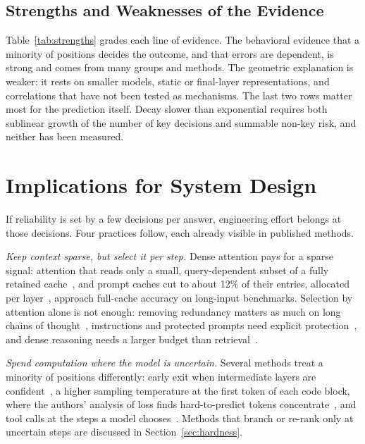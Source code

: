 \documentclass{ieeeaccess}
\begin{document}
\subsection{Strengths and Weaknesses of the Evidence}
Table~\ref{tab:strengths} grades each line of evidence. The behavioral evidence that a minority of positions decides the outcome, and that errors are dependent, is strong and comes from many groups and methods. The geometric explanation is weaker: it rests on smaller models, static or final-layer representations, and correlations that have not been tested as mechanisms. The last two rows matter most for the prediction itself. Decay slower than exponential requires both sublinear growth of the number of key decisions and summable non-key risk, and neither has been measured.

\section{Implications for System Design}
\label{sec:implications}
If reliability is set by a few decisions per answer, engineering effort belongs at those decisions. Four practices follow, each already visible in published methods.

\emph{Keep context sparse, but select it per step.} Dense attention pays for a sparse signal: attention that reads only a small, query-dependent subset of a fully retained cache~\cite{tang2024quest}, and prompt caches cut to about 12\% of their entries, allocated per layer~\cite{cai2024pyramidkv}, approach full-cache accuracy on long-input benchmarks. Selection by attention alone is not enough: removing redundancy matters as much on long chains of thought~\cite{cai2025rkv}, instructions and protected prompts need explicit protection~\cite{chen2026pitfalls}, and dense reasoning needs a larger budget than retrieval~\cite{liu2026semantic}.

\emph{Spend computation where the model is uncertain.} Several methods treat a minority of positions differently: early exit when intermediate layers are confident~\cite{schuster2022calm}, a higher sampling temperature at the first token of each code block, where the authors' analysis of loss finds hard-to-predict tokens concentrate~\cite{zhu2024hotorcold}, and tool calls at the steps a model chooses~\cite{moshkov2025aimo}. Methods that branch or re-rank only at uncertain steps are discussed in Section~\ref{sec:hardness}.
\end{document}
